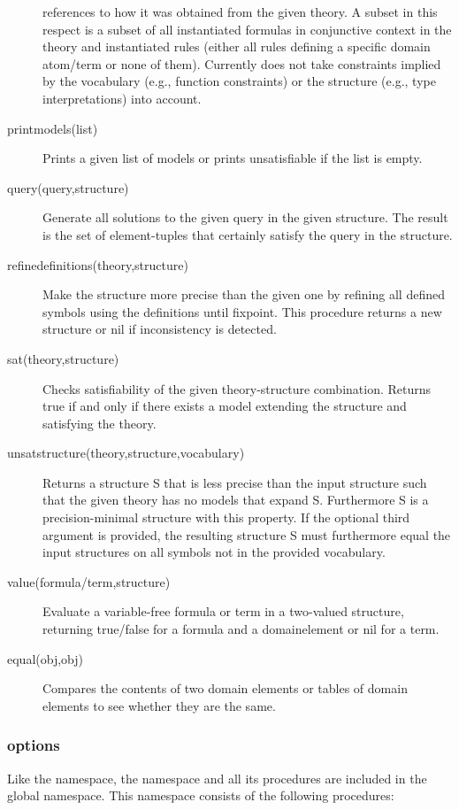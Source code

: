 \begin{description}
		references to how it was obtained from the given theory.
		A subset in this respect is a subset of all instantiated formulas in conjunctive context in the theory and instantiated rules 
		(either all rules defining a specific domain atom/term or none of them).
		Currently does not take constraints implied by the vocabulary (e.g., function constraints) or the structure (e.g., type interpretations) into account.
	\item[printmodels(list)]
		Prints a given list of models or prints unsatisfiable if the list is empty.
	\item[query(query,structure)]
 		Generate all solutions to the given query in the given structure. The result is the set of element-tuples that certainly satisfy the query in the structure.
	\item[refinedefinitions(theory,structure)]
		Make the structure more precise than the given one by refining all defined symbols using the definitions until fixpoint. This procedure returns a new structure or nil if inconsistency is detected.
	\item[sat(theory,structure)]
		Checks satisfiability of the given theory-structure combination. Returns true if and only if there exists a model extending the structure and satisfying the theory.
	\item[unsatstructure(theory,structure,vocabulary)]
		Returns a structure S that is less precise than the input structure such that the given theory has no models that expand S. Furthermore S is a precision-minimal structure with this property. If the optional third argument is provided, the resulting structure S must furthermore equal the input structures on all symbols not in the provided vocabulary.
	\item[value(formula/term,structure)]
		Evaluate a variable-free formula or term in a two-valued structure, returning true/false for a formula and a domainelement or nil for a term.
	\item[equal(obj,obj)]
		Compares the contents of two domain elements or tables of domain elements to see whether they are the same.		
\end{description}

\subsubsection{options}
Like the  namespace, the  namespace and all its procedures are included in the global namespace. This namespace consists of the following procedures:

